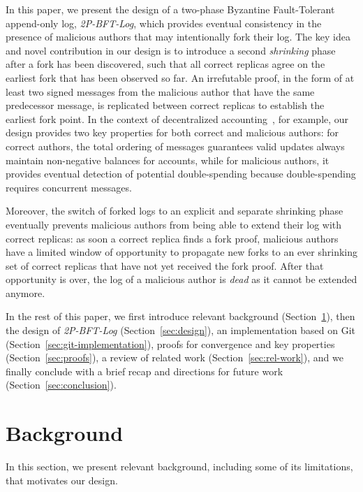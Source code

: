 \documentclass[9pt, oneside]{article}   	%
\begin{document}
In this paper, we present the design of a two-phase Byzantine Fault-Tolerant append-only log, \textit{2P-BFT-Log}, which provides eventual consistency in the presence of malicious authors that may intentionally fork their log. The key idea and novel contribution in our design is to introduce a second \textit{shrinking} phase after a fork has been discovered, such that all correct replicas agree on the earliest fork that has been observed so far. An irrefutable proof, in the form of at least two signed messages from the malicious author that have the same predecessor message, is replicated between correct replicas to establish the earliest fork point. In the context of decentralized accounting~\cite{lavoie2023gocledger}, for example, our design provides two key properties for both correct and malicious authors: for correct authors, the total ordering of messages guarantees valid updates always maintain non-negative balances for accounts, while for malicious authors, it provides eventual detection of potential double-spending because double-spending requires concurrent messages.

Moreover, the switch of forked logs to an explicit and separate shrinking phase eventually prevents malicious authors from being able to extend their log with correct replicas: as soon a correct replica finds a fork proof, malicious authors have a limited window of opportunity to propagate new forks to an ever shrinking set of correct replicas that have not yet received the fork proof. After that opportunity is over, the log of a malicious author is \textit{dead} as it cannot be extended anymore.

In the rest of this paper, we first introduce relevant background (Section~\ref{sec:background}), then the design of \textit{2P-BFT-Log} (Section~\ref{sec:design}), an implementation based on Git (Section~\ref{sec:git-implementation}),  proofs for convergence and key properties (Section~\ref{sec:proofs}), a review of related work (Section~\ref{sec:rel-work}), and we finally conclude with a brief recap and directions for future work (Section~\ref{sec:conclusion}).



\section{Background}
\label{sec:background}

In this section, we present relevant background, including some of its limitations, that motivates our design.
\end{document}
